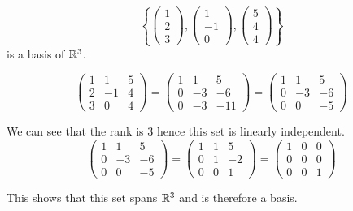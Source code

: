 \documentclass[a4paper,10pt]{article}
\begin{document}
\begin{ex}
	\[
		\left\{
			\begin{pmatrix}
				1 \\
				2 \\
				3
			\end{pmatrix}
			,
			\begin{pmatrix}
				1 \\
				-1 \\
				0
			\end{pmatrix}
			,
			\begin{pmatrix}
				5 \\
				4 \\
				4
			\end{pmatrix}
		\right\}
	\]
	is a basis of $\mathbb{R}^3$.

	\[
		\begin{pmatrix}
			1 & 1  & 5 \\
			2 & -1 & 4 \\
			3 & 0  & 4
		\end{pmatrix}
		=
		\begin{pmatrix}
			1 & 1  & 5  \\
			0 & -3 & -6 \\
			0 & -3 & -11
		\end{pmatrix}
		=
		\begin{pmatrix}
			1 & 1  & 5  \\
			0 & -3 & -6 \\
			0 & 0  & -5
		\end{pmatrix}
	\]

	We can see that the rank is $3$ hence this set is linearly independent.
	\[
		\begin{pmatrix}
			1 & 1  & 5  \\
			0 & -3 & -6 \\
			0 & 0  & -5
		\end{pmatrix}
		=
		\begin{pmatrix}
			1 & 1 & 5  \\
			0 & 1 & -2 \\
			0 & 0 & 1
		\end{pmatrix}
		=
		\begin{pmatrix}
			1 & 0 & 0 \\
			0 & 0 & 0 \\
			0 & 0 & 1
		\end{pmatrix}
	\]

	This shows that this set spans $\mathbb{R}^3$ and is therefore a basis.
\end{ex}
\end{document}
